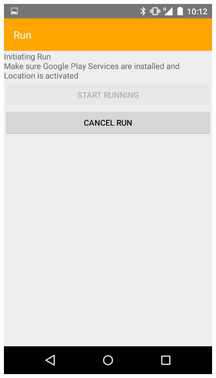 \begin{figure}[!h]
\centering
\begin{minipage}{.4\textwidth}
  \centering
  \includegraphics[width=.8\linewidth]{abb/bsp/bsp9}
  \label{fig:bsp9}
\end{minipage}
\begin{minipage}{.4\textwidth}
  \centering

\end{minipage}
\end{figure}
